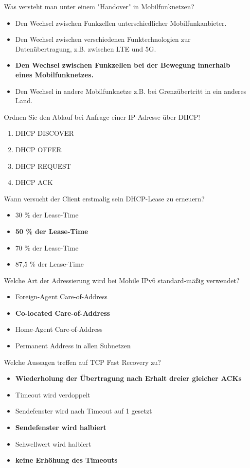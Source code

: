 \documentclass{article}
\begin{document}
	Was versteht man unter einem "Handover" in Mobilfunknetzen? 
	\begin{itemize}
		\item Den Wechsel zwischen Funkzellen unterschiedlicher Mobilfunkanbieter. 
		\item Den Wechsel zwischen verschiedenen Funktechnologien zur Datenübertragung, z.B. zwischen LTE und 5G. 
		\item \textbf{Den Wechsel zwischen Funkzellen bei der Bewegung innerhalb eines Mobilfunknetzes.}
		\item Den Wechsel in andere Mobilfunknetze z.B. bei Grenzübertritt in ein anderes Land. 
	\end{itemize}

	Ordnen Sie den Ablauf bei Anfrage einer IP-Adresse über DHCP! 
	\begin{enumerate}
		\item DHCP DISCOVER 
		\item DHCP OFFER 
		\item DHCP REQUEST 
		\item DHCP ACK 
	\end{enumerate}

	Wann versucht der Client erstmalig sein DHCP-Lease zu erneuern? 
	\begin{itemize}
		\item 30 \% der Lease-Time 
		\item \textbf{50 \% der Lease-Time }
		\item 70 \% der Lease-Time
		\item 87,5 \% der Lease-Time 
	\end{itemize}

	Welche Art der Adressierung wird bei Mobile IPv6 standard-mäßig verwendet? 
	\begin{itemize}
		\item Foreign-Agent Care-of-Address
		\item \textbf{Co-located Care-of-Address }
		\item Home-Agent Care-of-Address
		\item Permanent Address in allen Subnetzen
	\end{itemize}

	Welche Aussagen treffen auf TCP Fast Recovery zu? 
	\begin{itemize}
		\item \textbf{Wiederholung der Übertragung nach Erhalt dreier gleicher ACKs}
		\item Timeout wird verdoppelt
		\item Sendefenster wird nach Timeout auf 1 gesetzt
		\item \textbf{Sendefenster wird halbiert }
		\item Schwellwert wird halbiert
		\item \textbf{keine Erhöhung des Timeouts}
	\end{itemize}
\end{document}

